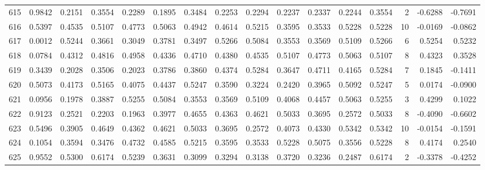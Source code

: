 \begin{tabular}{lrrrrrrrrrrrrrrr}
615 &      0.9842 &  0.2151 &  0.3554 &  0.2289 &  0.1895 &  0.3484 &  0.2253 &  0.2294 &  0.2237 &  0.2337 &   0.2244 &     0.3554 &      2 &                   -0.6288 &                    -0.7691 \\
616 &      0.5397 &  0.4535 &  0.5107 &  0.4773 &  0.5063 &  0.4942 &  0.4614 &  0.5215 &  0.3595 &  0.3533 &   0.5228 &     0.5228 &     10 &                   -0.0169 &                    -0.0862 \\
617 &      0.0012 &  0.5244 &  0.3661 &  0.3049 &  0.3781 &  0.3497 &  0.5266 &  0.5084 &  0.3553 &  0.3569 &   0.5109 &     0.5266 &      6 &                    0.5254 &                     0.5232 \\
618 &      0.0784 &  0.4312 &  0.4816 &  0.4958 &  0.4336 &  0.4710 &  0.4380 &  0.4535 &  0.5107 &  0.4773 &   0.5063 &     0.5107 &      8 &                    0.4323 &                     0.3528 \\
619 &      0.3439 &  0.2028 &  0.3506 &  0.2023 &  0.3786 &  0.3860 &  0.4374 &  0.5284 &  0.3647 &  0.4711 &   0.4165 &     0.5284 &      7 &                    0.1845 &                    -0.1411 \\
620 &      0.5073 &  0.4173 &  0.5165 &  0.4075 &  0.4437 &  0.5247 &  0.3590 &  0.3224 &  0.2420 &  0.3965 &   0.5092 &     0.5247 &      5 &                    0.0174 &                    -0.0900 \\
621 &      0.0956 &  0.1978 &  0.3887 &  0.5255 &  0.5084 &  0.3553 &  0.3569 &  0.5109 &  0.4068 &  0.4457 &   0.5063 &     0.5255 &      3 &                    0.4299 &                     0.1022 \\
622 &      0.9123 &  0.2521 &  0.2203 &  0.1963 &  0.3977 &  0.4655 &  0.4363 &  0.4621 &  0.5033 &  0.3695 &   0.2572 &     0.5033 &      8 &                   -0.4090 &                    -0.6602 \\
623 &      0.5496 &  0.3905 &  0.4649 &  0.4362 &  0.4621 &  0.5033 &  0.3695 &  0.2572 &  0.4073 &  0.4330 &   0.5342 &     0.5342 &     10 &                   -0.0154 &                    -0.1591 \\
624 &      0.1054 &  0.3594 &  0.3476 &  0.4732 &  0.4585 &  0.5215 &  0.3595 &  0.3533 &  0.5228 &  0.5075 &   0.3556 &     0.5228 &      8 &                    0.4174 &                     0.2540 \\
625 &      0.9552 &  0.5300 &  0.6174 &  0.5239 &  0.3631 &  0.3099 &  0.3294 &  0.3138 &  0.3720 &  0.3236 &   0.2487 &     0.6174 &      2 &                   -0.3378 &                    -0.4252 \\

\end{tabular}
